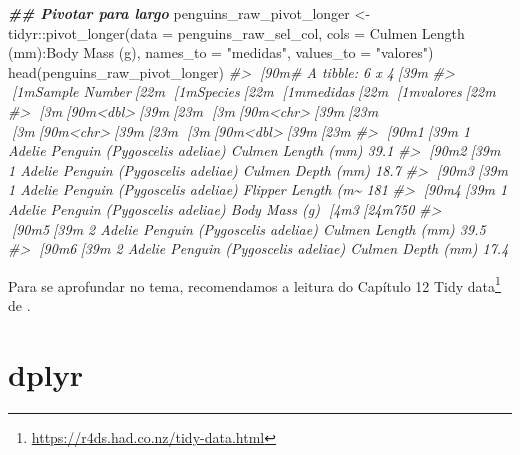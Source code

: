 \documentclass[
]{book}
\newenvironment{Shaded}{\begin{snugshade}}{\end{snugshade}}
\newcommand{\AttributeTok}[1]{\textcolor[rgb]{0.61,0.61,0.61}{#1}}
\newcommand{\CommentTok}[1]{\textcolor[rgb]{0.37,0.37,0.37}{\textit{#1}}}
\newcommand{\DocumentationTok}[1]{\textcolor[rgb]{0.37,0.37,0.37}{\textbf{\textit{#1}}}}
\newcommand{\FunctionTok}[1]{\textcolor[rgb]{0,0,0}{#1}}
\newcommand{\NormalTok}[1]{#1}
\newcommand{\OtherTok}[1]{\textcolor[rgb]{0.37,0.37,0.37}{#1}}
\newcommand{\SpecialCharTok}[1]{\textcolor[rgb]{0,0,0}{#1}}
\newcommand{\StringTok}[1]{\textcolor[rgb]{0.5,0.5,0.5}{#1}}
\renewcommand{\href}[2]{#2\footnote{\url{#1}}}
\begin{document}
\begin{Shaded}
\begin{Highlighting}[]
\DocumentationTok{\#\# Pivotar para largo}
\NormalTok{penguins\_raw\_pivot\_longer }\OtherTok{\textless{}{-}}\NormalTok{ tidyr}\SpecialCharTok{::}\FunctionTok{pivot\_longer}\NormalTok{(}\AttributeTok{data =}\NormalTok{ penguins\_raw\_sel\_col, }
                                                 \AttributeTok{cols =} \StringTok{\textasciigrave{}}\AttributeTok{Culmen Length (mm)}\StringTok{\textasciigrave{}}\SpecialCharTok{:}\StringTok{\textasciigrave{}}\AttributeTok{Body Mass (g)}\StringTok{\textasciigrave{}}\NormalTok{,}
                                                 \AttributeTok{names\_to =} \StringTok{"medidas"}\NormalTok{, }
                                                 \AttributeTok{values\_to =} \StringTok{"valores"}\NormalTok{)}
\FunctionTok{head}\NormalTok{(penguins\_raw\_pivot\_longer)}
\CommentTok{\#\textgreater{} [90m\# A tibble: 6 x 4[39m}
\CommentTok{\#\textgreater{}   [1m\textasciigrave{}Sample Number\textasciigrave{}[22m [1mSpecies[22m                             [1mmedidas[22m            [1mvalores[22m}
\CommentTok{\#\textgreater{}             [3m[90m\textless{}dbl\textgreater{}[39m[23m [3m[90m\textless{}chr\textgreater{}[39m[23m                               [3m[90m\textless{}chr\textgreater{}[39m[23m                [3m[90m\textless{}dbl\textgreater{}[39m[23m}
\CommentTok{\#\textgreater{} [90m1[39m               1 Adelie Penguin (Pygoscelis adeliae) Culmen Length (mm)    39.1}
\CommentTok{\#\textgreater{} [90m2[39m               1 Adelie Penguin (Pygoscelis adeliae) Culmen Depth (mm)     18.7}
\CommentTok{\#\textgreater{} [90m3[39m               1 Adelie Penguin (Pygoscelis adeliae) Flipper Length (m\textasciitilde{}   181  }
\CommentTok{\#\textgreater{} [90m4[39m               1 Adelie Penguin (Pygoscelis adeliae) Body Mass (g)       [4m3[24m750  }
\CommentTok{\#\textgreater{} [90m5[39m               2 Adelie Penguin (Pygoscelis adeliae) Culmen Length (mm)    39.5}
\CommentTok{\#\textgreater{} [90m6[39m               2 Adelie Penguin (Pygoscelis adeliae) Culmen Depth (mm)     17.4}
\end{Highlighting}
\end{Shaded}

Para se aprofundar no tema, recomendamos a leitura do Capítulo \href{https://r4ds.had.co.nz/tidy-data.html}{12 Tidy data} de \citet{wickham2017}.

\hypertarget{dplyr}{%
\section{dplyr}\label{dplyr}}
\end{document}
